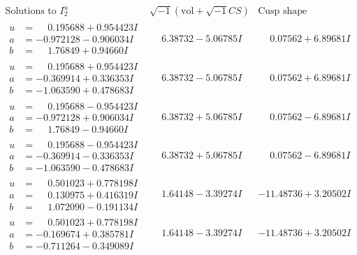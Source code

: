 \documentclass[1p]{elsarticle_modified}
\theoremstyle{definition}
\newcommand{\I}{\sqrt{-1}}
\begin{document}
$$\begin{array}{c|c|c}  
\text{Solutions to }I^u_{2}& \I (\text{vol} + \sqrt{-1}CS) & \text{Cusp shape}\\
 \hline 
\begin{aligned}
u &= \phantom{-}0.195688 + 0.954423 I \\
a &= -0.972128 - 0.906034 I \\
b &= \phantom{-}1.76849 + 0.94660 I\end{aligned}
 & \phantom{-}6.38732 - 5.06785 I & \phantom{-}0.07562 + 6.89681 I \\ \hline\begin{aligned}
u &= \phantom{-}0.195688 + 0.954423 I \\
a &= -0.369914 + 0.336353 I \\
b &= -1.063590 + 0.478683 I\end{aligned}
 & \phantom{-}6.38732 - 5.06785 I & \phantom{-}0.07562 + 6.89681 I \\ \hline\begin{aligned}
u &= \phantom{-}0.195688 - 0.954423 I \\
a &= -0.972128 + 0.906034 I \\
b &= \phantom{-}1.76849 - 0.94660 I\end{aligned}
 & \phantom{-}6.38732 + 5.06785 I & \phantom{-}0.07562 - 6.89681 I \\ \hline\begin{aligned}
u &= \phantom{-}0.195688 - 0.954423 I \\
a &= -0.369914 - 0.336353 I \\
b &= -1.063590 - 0.478683 I\end{aligned}
 & \phantom{-}6.38732 + 5.06785 I & \phantom{-}0.07562 - 6.89681 I \\ \hline\begin{aligned}
u &= \phantom{-}0.501023 + 0.778198 I \\
a &= \phantom{-}0.130975 + 0.416319 I \\
b &= \phantom{-}1.072090 - 0.191134 I\end{aligned}
 & \phantom{-}1.64148 - 3.39274 I & -11.48736 + 3.20502 I \\ \hline\begin{aligned}
u &= \phantom{-}0.501023 + 0.778198 I \\
a &= -0.169674 + 0.385781 I \\
b &= -0.711264 - 0.349089 I\end{aligned}
 & \phantom{-}1.64148 - 3.39274 I & -11.48736 + 3.20502 I \\ \hline\begin{aligned}

\end{aligned}
\end{array}$$
\end{document}
